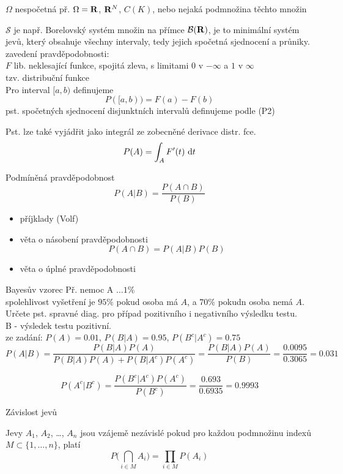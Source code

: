 \documentclass[smaller]{beamer}
\def\Real{{\rm\bf R}}
\def\d{\,{\rm d}}               %
\def\dt{\,\d t}
\def\blue#1{{\usebeamercolor[fg]{my blue} #1}}
\def\xskip{{\vspace{2ex}}}
\begin{document}
\begin{frame}{$\Omega$ nespočetná}
př. $\Omega = \Real$, $\Real^N$, $C(K)$, nebo nejaká podmnožina těchto množin

\xskip
       $\mathcal{S}$ je např. \blue{Borelovský systém} množin na přímce $\mathcal B(\Real)$, je to minimální systém
       jevů, který obsahuje všechny intervaly, tedy jejich spočetná sjednocení a průniky.
\xskip
zavedení pravděpodobnosti: \\
$F$ lib. neklesající funkce, spojitá zleva, s limitami $0$ v $-\infty$ a $1$ v $\infty$\\
tzv. \blue{distribuční funkce}\\
Pro interval $[a,b)$ definujeme
\[
  P([a,b)) = F(a)- F(b)
\]
pst. spočetných sjednocení disjunktních intervalů definujeme podle (P2)

Pst. lze také vyjádřit jako integrál ze zobecněné derivace distr. fce.
\[
  P(A) = \int_{A} F'(t) \dt
\]
\end{frame}

\begin{frame}{Podmíněná pravděpodobnost}
\[
P(A|B) = \frac{P(A\cap B)}{P(B)}
\]
\begin{itemize}
\item příjklady (Volf)
\item věta o \blue{násobení pravděpodobnosti}
\[
P(A\cap B) = P(A|B) P(B)
\]
\item věta o úplné pravděpodobnosti
\end{itemize}
\end{frame}



\begin{frame}{Bayesův vzorec}
Př. nemoc A $\dots 1\%$ \\
    spolehlivost vyšetření je $95\%$ pokud osoba má $A$, a $70\%$ pokudn osoba nemá $A$.
    Určete pst. spravné diag. pro případ pozitivního i negativního výsledku testu.\\

    B - výsledek testu pozitivní.\\

   ze zadání: $P(A) = 0.01$, $P(B| A) = 0.95$, $P(B^c|A^c)=0.75$\\
   \[
     P(A| B) = \frac{P(B| A) P(A)}{P(B| A)P(A) + P(B| A^c)P(A^c)}=
 \frac{P(B| A) P(A)}{P(B)} = \frac{0.0095}{0.3065}=0.031
   \]

   \[
     P(A^c| B^c) =
 \frac{P(B^c| A^c) P(A^c)}{P(B^c)} = \frac{0.693}{0.6935}=0.9993
   \]
\end{frame}

\begin{frame}{Závislost jevů}
\begin{definition}
Jevy $A_1$, $A_2$, \dots, $A_n$ jsou \blue{vzájemě nezávislé} pokud pro každou 
podmnožinu indexů $M \subset \{1,\dots,n\}$, platí
\[
P\big(\bigcap_{i\in M} A_i\big) = \prod_{i\in M} P(A_i)
\]
\end{definition}
\end{frame}





  
\end{document}
